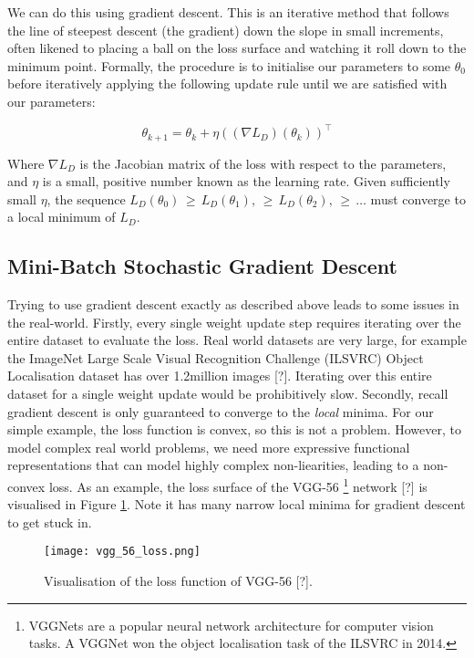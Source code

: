 We can do this using gradient descent. This is an iterative method that follows the line of steepest descent (the gradient) down the slope in small increments, often likened to placing a ball on the loss surface and watching it roll down to the minimum point. Formally, the procedure is to initialise our parameters to some \(\theta_0\) before iteratively applying the following update rule until we are satisfied with our parameters:

\begin{equation*}
    \theta_{k+1} = \theta_k + \eta((\nabla L_D)(\theta_k))^\top
\end{equation*}

Where \(\nabla L_D\) is the Jacobian matrix of the loss with respect to the parameters, and \(\eta\) is a small, positive number known as the learning rate. Given sufficiently small \(\eta\), the sequence \(L_D(\theta_0) \,\geq\, L_D(\theta_1), \,\geq\, L_D(\theta_2), \,\geq\, \ldots\) must converge to a local minimum of \(L_D\). 

\subsection{Mini-Batch Stochastic Gradient Descent}
Trying to use gradient descent exactly as described above leads to some issues in the real-world. Firstly, every single weight update step requires iterating over the entire dataset to evaluate the loss. Real world datasets are very large, for example the ImageNet Large Scale Visual Recognition Challenge (ILSVRC) Object Localisation dataset has over 1.2million images [?]. Iterating over this entire dataset for a single weight update would be prohibitively slow. Secondly, recall gradient descent is only guaranteed to converge to the \textit{local} minima. For our simple example, the loss function is convex, so this is not a problem. However, to model complex real world problems, we need more expressive functional representations that can model highly complex non-liearities, leading to a non-convex loss. As an example, the loss surface of the VGG-56 \footnote{VGGNets are a popular neural network architecture for computer vision tasks. A VGGNet won the object localisation task of the ILSVRC in 2014.} network [?] is visualised in Figure \ref{fig:2-vgg-loss}. Note it has many narrow local minima for gradient descent to get stuck in.

\begin{figure}[h]
    \centering
    \texttt{[image: vgg\_56\_loss.png]}
    \caption{Visualisation of the loss function of VGG-56 [?].}
    \label{fig:2-vgg-loss}
\end{figure}

